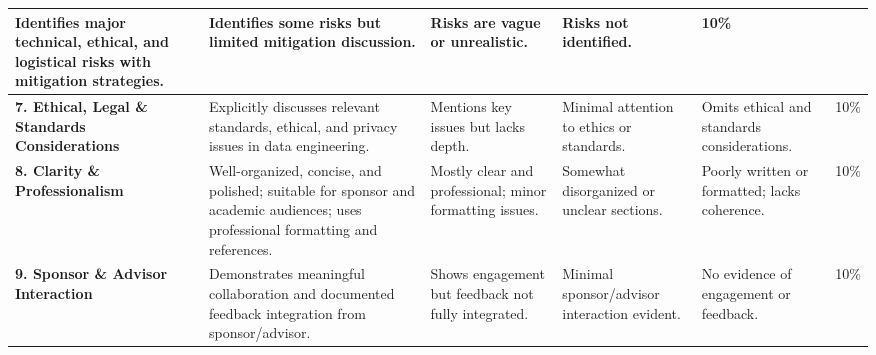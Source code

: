 \documentclass[landscape, 11pt]{article}
\begin{document}
\begin{longtable}{L{2.8cm}L{7cm}L{4cm}L{4cm}L{4cm}|c}
Identifies major technical, ethical, and logistical risks with mitigation strategies. &
Identifies some risks but limited mitigation discussion. &
Risks are vague or unrealistic. &
Risks not identified. & 10\% \\
\midrule
\textbf{7. Ethical, Legal \& Standards Considerations} &
Explicitly discusses relevant standards, ethical, and privacy issues in data engineering. &
Mentions key issues but lacks depth. &
Minimal attention to ethics or standards. &
Omits ethical and standards considerations. & 10\% \\
\midrule
\textbf{8. Clarity \& Professionalism} &
Well-organized, concise, and polished; suitable for sponsor and academic audiences; uses professional formatting and references. &
Mostly clear and professional; minor formatting issues. &
Somewhat disorganized or unclear sections. &
Poorly written or formatted; lacks coherence. & 10\% \\
\midrule
\textbf{9. Sponsor \& Advisor Interaction} &
Demonstrates meaningful collaboration and documented feedback integration from sponsor/advisor. &
Shows engagement but feedback not fully integrated. &
Minimal sponsor/advisor interaction evident. &
No evidence of engagement or feedback. & 10\% \\
\bottomrule
\end{longtable}
\end{document}
